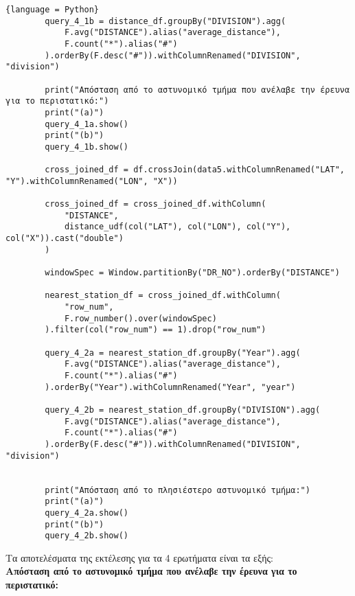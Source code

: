 \documentclass{article}
\begin{document}
\begin{lstlisting}{language = Python}
        query_4_1b = distance_df.groupBy("DIVISION").agg(
            F.avg("DISTANCE").alias("average_distance"),
            F.count("*").alias("#")
        ).orderBy(F.desc("#")).withColumnRenamed("DIVISION", "division")

        print("Απόσταση από το αστυνομικό τμήμα που ανέλαβε την έρευνα για το περιστατικό:")
        print("(a)")
        query_4_1a.show() 
        print("(b)")
        query_4_1b.show() 

        cross_joined_df = df.crossJoin(data5.withColumnRenamed("LAT", "Y").withColumnRenamed("LON", "X"))

        cross_joined_df = cross_joined_df.withColumn(
            "DISTANCE",
            distance_udf(col("LAT"), col("LON"), col("Y"), col("X")).cast("double")
        )

        windowSpec = Window.partitionBy("DR_NO").orderBy("DISTANCE")

        nearest_station_df = cross_joined_df.withColumn(
            "row_num",
            F.row_number().over(windowSpec)
        ).filter(col("row_num") == 1).drop("row_num")

        query_4_2a = nearest_station_df.groupBy("Year").agg(
            F.avg("DISTANCE").alias("average_distance"),
            F.count("*").alias("#")
        ).orderBy("Year").withColumnRenamed("Year", "year")

        query_4_2b = nearest_station_df.groupBy("DIVISION").agg(
            F.avg("DISTANCE").alias("average_distance"),
            F.count("*").alias("#")
        ).orderBy(F.desc("#")).withColumnRenamed("DIVISION", "division")


        print("Απόσταση από το πλησιέστερο αστυνομικό τμήμα:")
        print("(a)")
        query_4_2a.show()
        print("(b)")
        query_4_2b.show()
\end{lstlisting}

\vspace{3mm}

Τα αποτελέσματα της εκτέλεσης για τα 4 ερωτήματα είναι τα εξής: \\

\noindent\textbf{Απόσταση από το αστυνομικό τμήμα που ανέλαβε την έρευνα για το περιστατικό:}
\end{document}
